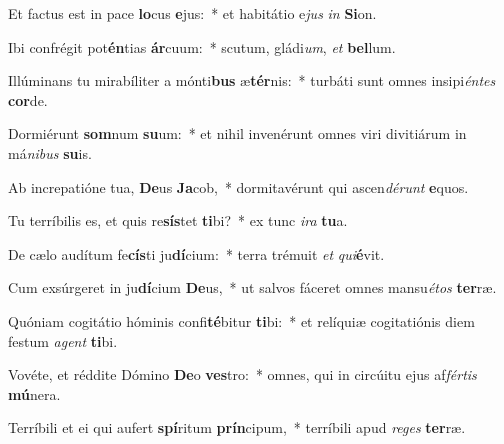 \item Et factus est in pace \textbf{lo}cus \textbf{e}jus:~* et habitátio e\textit{jus} \textit{in} \textbf{Si}on.
\item Ibi confrégit pot\textbf{én}tias \textbf{ár}cuum:~* scutum, gládi\textit{um}, \textit{et} \textbf{bel}lum.
\item Illúminans tu mirabíliter a mónti\textbf{bus} æ\textbf{tér}nis:~* turbáti sunt omnes insipi\textit{én}\textit{tes} \textbf{cor}de.
\item Dormiérunt \textbf{som}num \textbf{su}um:~* et nihil invenérunt omnes viri divitiárum in má\textit{ni}\textit{bus} \textbf{su}is.
\item Ab increpatióne tua, \textbf{De}us \textbf{Ja}cob,~* dormitavérunt qui ascen\textit{dé}\textit{runt} \textbf{e}quos.
\item Tu terríbilis es, et quis re\textbf{sís}tet \textbf{ti}bi?~* ex tunc \textit{i}\textit{ra} \textbf{tu}a.
\item De cælo audítum fe\textbf{cís}ti ju\textbf{dí}cium:~* terra trémuit \textit{et} \textit{qui}\textbf{é}vit.
\item Cum exsúrgeret in ju\textbf{dí}cium \textbf{De}us,~* ut salvos fáceret omnes mansu\textit{é}\textit{tos} \textbf{ter}ræ.
\item Quóniam cogitátio hóminis confi\textbf{té}bitur \textbf{ti}bi:~* et relíquiæ cogitatiónis diem festum \textit{a}\textit{gent} \textbf{ti}bi.
\item Vovéte, et réddite Dómino \textbf{De}o \textbf{ves}tro:~* omnes, qui in circúitu ejus af\textit{fér}\textit{tis} \textbf{mú}nera.
\item Terríbili et ei qui aufert \textbf{spí}ritum \textbf{prín}cipum,~* terríbili apud \textit{re}\textit{ges} \textbf{ter}ræ.
